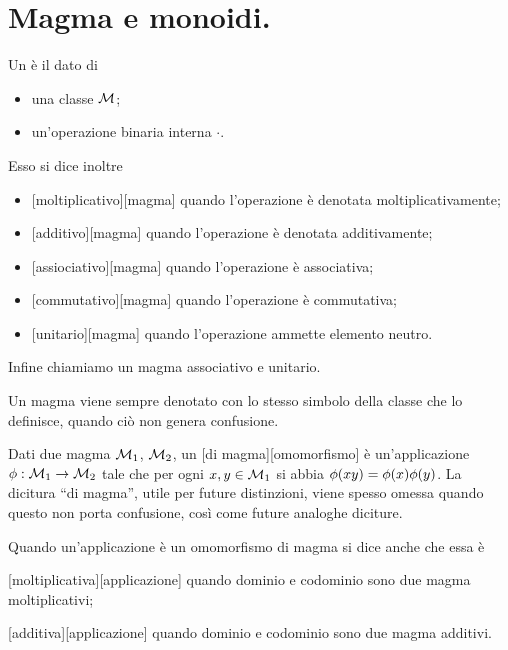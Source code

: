 \section{Magma e monoidi.}\label{Magma}
\begin{Definition}
	Un  \`e il dato di
	\begin{itemize}
		\item una classe $\mathcal{M}$;
		\item un'operazione binaria interna $\cdot$.
	\end{itemize}
	Esso si dice inoltre
	\begin{itemize}
		\item {}[moltiplicativo][magma] quando l'operazione \`e denotata moltiplicativamente;
		\item {}[additivo][magma] quando l'operazione \`e denotata additivamente;
		\item {}[assiociativo][magma] quando l'operazione \`e associativa;
		\item {}[commutativo][magma] quando l'operazione \`e commutativa;
		\item {}[unitario][magma] quando l'operazione ammette elemento neutro.
	\end{itemize}
	Infine chiamiamo  un magma associativo e unitario.
	\par Un magma viene sempre denotato con lo stesso simbolo della classe che lo definisce, quando ci\`o non genera confusione.
\end{Definition}
\begin{Definition}
	Dati due magma $\mathcal{M}_1$, $\mathcal{M}_2$, un [di magma][omomorfismo] \`e un'applicazione $\phi: \mathcal{M}_1 \rightarrow \mathcal{M}_2$ tale che per ogni $x, y \in \mathcal{M}_1$ si abbia $\phi(xy) = \phi(x)\phi(y)$. La dicitura ``di magma'', utile per future distinzioni, viene spesso omessa quando questo non porta confusione, cos\`i come future analoghe diciture.
	\par Quando un'applicazione \`e un omomorfismo di magma si dice anche che essa \`e
	\begin{item}
		\item {}[moltiplicativa][applicazione] quando dominio e codominio sono due magma moltiplicativi;
		\item {}[additiva][applicazione] quando dominio e codominio sono due magma additivi.
	\end{item}
\end{Definition}

